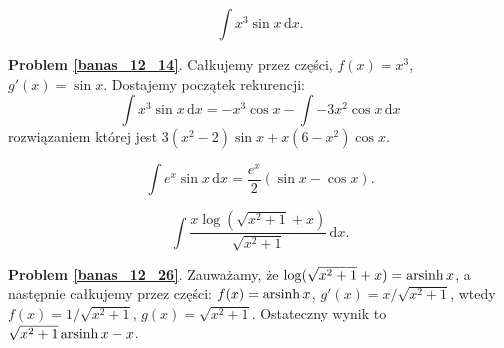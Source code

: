 \begin{problem_with_solution}
    \label{banas_12_14}%
    \begin{equation}
        \int x^3 \sin x \, \mathrm{d}x.
    \end{equation}
\end{problem_with_solution}

\textbf{Problem \ref{banas_12_14}}.
Całkujemy przez części, $f(x) = x^3$, $g'(x) = \sin x$.
Dostajemy początek rekurencji:
\begin{equation}
    \int x^3 \sin x \, \mathrm{d}x = - x^3 \cos x - \int - 3x^2 \cos x \,\mathrm{d}x
\end{equation}
rozwiązaniem której jest $3 (x^2-2) \sin x + x (6-x^2) \cos x$.

\begin{problem}
    \label{banas_12_19_auxilia}%
    \begin{equation}
        \int e^x \sin x \,\mathrm{d}x = \frac {e^x} 2 (\sin x - \cos x).
    \end{equation}
\end{problem}




\begin{problem_with_solution}
    \label{banas_12_26}%
    \begin{equation}
        \int \frac{x \log(\sqrt{x^2+1}+x)}{\sqrt{x^2+1}} \,\mathrm{d}x.
    \end{equation}
\end{problem_with_solution}

\textbf{Problem \ref{banas_12_26}}.
Zauważamy, że $\log(\sqrt{x^2+1} + x) = \operatorname{arsinh} x$, a następnie całkujemy przez części: $f(x) = \operatorname{arsinh} x$, $g'(x) = x / \sqrt{x^2+1}$, wtedy $f(x) = 1/\sqrt{x^2+1}$, $g(x) = \sqrt{x^2+1}$.
Ostateczny wynik to $\sqrt{x^2+1} \operatorname{arsinh} x - x$.

